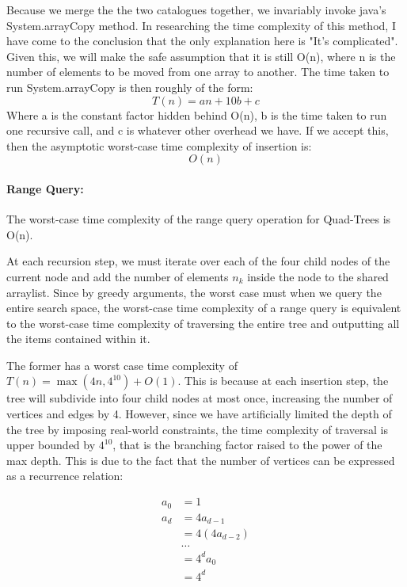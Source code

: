 \documentclass[12pt]{article}
\begin{document}
{Because we merge the the two catalogues together, we invariably invoke java's System.arrayCopy method. In researching the time complexity of this method, I have come to the conclusion that the only explanation here is "It's complicated". Given this, we will make the safe assumption that it is still O(n), where n is the number of elements to be moved from one array to another. \newline
The time taken to run System.arrayCopy is then roughly of the form:
$$T(n) = an + 10b + c$$
Where a is the constant factor hidden behind O(n), b is the time taken to run one recursive call, and c is whatever other overhead we have. If we accept this, then the asymptotic worst-case time complexity of insertion is:
$$O(n)$$


\paragraph{Range Query:} 
The worst-case time complexity of the range query operation for Quad-Trees is O(n).

At each recursion step, we must iterate over each of the four child nodes of the current node and add the number of elements $n_k$ inside the node to the shared arraylist. Since by greedy arguments, the worst case must when we query the entire search space, the worst-case time complexity of a range query is equivalent to the worst-case time complexity of traversing the entire tree and outputting all the items contained within it. 

The former has a worst case time complexity of $T(n) = \max(4n, 4^{10}) + O(1)$. This is because at each insertion step, the tree will subdivide into four child nodes at most once, increasing the number of vertices and edges by 4. However, since we have artificially limited the depth of the tree by imposing real-world constraints, the time complexity of traversal is upper bounded by $4^{10}$, that is the branching factor raised to the power of the max depth. This is due to the fact that the number of vertices can be expressed as a recurrence relation:

\begin{align*}
a_0 & = 1 \\
a_d & = 4a_{d-1}\\
    & = 4(4a_{d-2}) \\
    & \ldots \\
    & = 4^da_0 \\
    & = 4^d \\
\end{align*}

}
\end{document}

